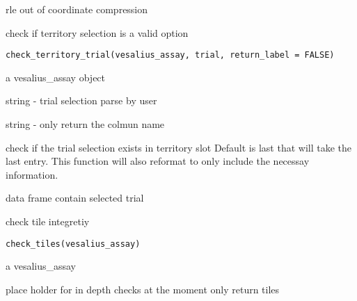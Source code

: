 \documentclass[a4paper]{book}
\begin{document}
%
\begin{Value}
rle out of coordinate compression
\end{Value}
%
\begin{Description}
check if territory selection is a valid option
\end{Description}
%
\begin{Usage}
\begin{verbatim}
check_territory_trial(vesalius_assay, trial, return_label = FALSE)
\end{verbatim}
\end{Usage}
%
\begin{Arguments}
\begin{ldescription}
\item[\code{vesalius\_assay}] a vesalius\_assay object

\item[\code{trial}] string - trial selection parse by user

\item[\code{return\_label}] string - only return the colmun name
\end{ldescription}
\end{Arguments}
%
\begin{Details}
check if the trial selection exists in territory slot
Default is last that will take the last entry. This function
will also reformat to only include the necessay information.
\end{Details}
%
\begin{Value}
data frame contain selected trial
\end{Value}
%
\begin{Description}
check tile integretiy
\end{Description}
%
\begin{Usage}
\begin{verbatim}
check_tiles(vesalius_assay)
\end{verbatim}
\end{Usage}
%
\begin{Arguments}
\begin{ldescription}
\item[\code{vesalius\_assay}] a vesalius\_assay
\end{ldescription}
\end{Arguments}
%
\begin{Details}
place holder for in depth checks at the moment only return tiles
\end{Details}
\end{document}
